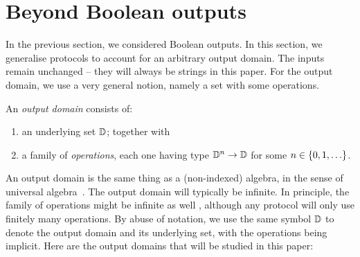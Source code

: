 \section{Beyond Boolean outputs}
\label{sec:beyond-boolean-outputs}

In the previous section, we considered Boolean outputs. In this section, we generalise protocols to account for an arbitrary output domain. The inputs remain unchanged -- they will always be strings in this paper.  For the output domain, we use a very general notion, namely a set with some operations. 
\begin{definition}
    An \emph{output domain} consists of: 
    \begin{enumerate}
        \item an underlying set $\mathbb D$; together with
        \item a family of \emph{operations}, each one having  type $\mathbb D^n \to \mathbb D$ for some $n \in \{0,1,\ldots\}$.
    \end{enumerate}
\end{definition}
An output domain is the same thing as a (non-indexed) algebra, in the sense of universal algebra~\cite[p.5]{hobby1988structure}. 
The output domain will typically  be infinite. In principle, the family of operations might be infinite as well , although any protocol will only use finitely many operations.
By abuse of notation, we use the same symbol $\mathbb D$ to denote the output domain and its underlying set, with the operations being implicit. Here are the output domains that will be studied in this paper: 
